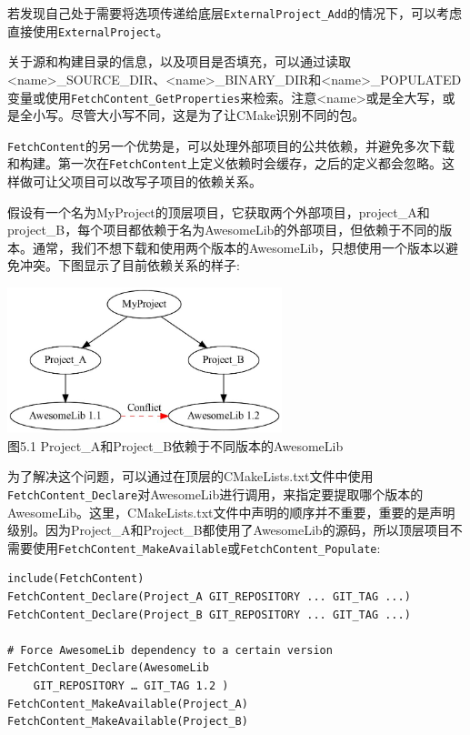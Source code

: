 \begin{tcolorbox}[colback=webgreen!5!white,colframe=webgreen!75!black,title=Note]
若发现自己处于需要将选项传递给底层\texttt{ExternalProject\_Add}的情况下，可以考虑直接使用\texttt{ExternalProject}。
\end{tcolorbox}

关于源和构建目录的信息，以及项目是否填充，可以通过读取<name>\_SOURCE\_DIR、<name>\_BINARY\_DIR和<name>\_POPULATED变量或使用\texttt{FetchContent\_GetProperties}来检索。注意<name>或是全大写，或是全小写。尽管大小写不同，这是为了让CMake识别不同的包。
 
\texttt{FetchContent}的另一个优势是，可以处理外部项目的公共依赖，并避免多次下载和构建。第一次在\texttt{FetchContent}上定义依赖时会缓存，之后的定义都会忽略。这样做可让父项目可以改写子项目的依赖关系。

假设有一个名为MyProject的顶层项目，它获取两个外部项目，project\_A和project\_B，每个项目都依赖于名为AwesomeLib的外部项目，但依赖于不同的版本。通常，我们不想下载和使用两个版本的AwesomeLib，只想使用一个版本以避免冲突。下图显示了目前依赖关系的样子:

\begin{center}
\includegraphics[width=0.6\textwidth]{content/2/chapter5/images/1.jpg}\\
图5.1  Project\_A和Project\_B依赖于不同版本的AwesomeLib
\end{center}

为了解决这个问题，可以通过在顶层的CMakeLists.txt文件中使用\texttt{FetchContent\_Declare}对AwesomeLib进行调用，来指定要提取哪个版本的AwesomeLib。这里，CMakeLists.txt文件中声明的顺序并不重要，重要的是声明级别。因为Project\_A和Project\_B都使用了AwesomeLib的源码，所以顶层项目不需要使用\texttt{FetchContent\_MakeAvailable}或\texttt{FetchContent\_Populate}:

\begin{lstlisting}[style=styleCMake]
include(FetchContent)
FetchContent_Declare(Project_A GIT_REPOSITORY ... GIT_TAG ...)
FetchContent_Declare(Project_B GIT_REPOSITORY ... GIT_TAG ...)

# Force AwesomeLib dependency to a certain version
FetchContent_Declare(AwesomeLib
	GIT_REPOSITORY … GIT_TAG 1.2 )
FetchContent_MakeAvailable(Project_A)
FetchContent_MakeAvailable(Project_B)
\end{lstlisting}

